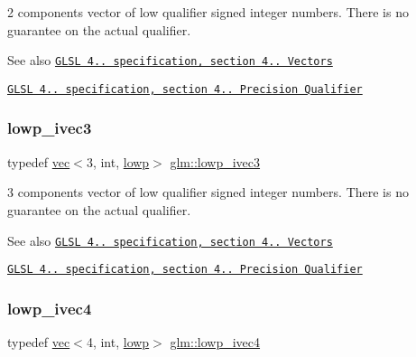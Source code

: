 2 components vector of low qualifier signed integer numbers. There is no guarantee on the actual qualifier.

\begin{DoxySeeAlso}{See also}
\href{http://www.opengl.org/registry/doc/GLSLangSpec.4.20.8.pdf}{\tt G\+L\+SL 4.. specification, section 4.. Vectors} 

\href{http://www.opengl.org/registry/doc/GLSLangSpec.4.20.8.pdf}{\tt G\+L\+SL 4.. specification, section 4.. Precision Qualifier} 
\end{DoxySeeAlso}
\mbox{\label{group__core__precision_ga77f1494e08fca27e26aebbbfb8162298}} 
\subsubsection{\texorpdfstring{lowp\+\_\+ivec3}{lowp\_ivec3}}
{\footnotesize\ttfamily typedef \hyperlink{structglm_1_1vec}{vec}$<$3, int, \hyperlink{namespaceglm_a36ed105b07c7746804d7fdc7cc90ff25ae161af3fc695e696ce3bf69f7332bc2d}{lowp}$>$ \hyperlink{group__core__precision_ga77f1494e08fca27e26aebbbfb8162298}{glm\+::lowp\+\_\+ivec3}}

3 components vector of low qualifier signed integer numbers. There is no guarantee on the actual qualifier.

\begin{DoxySeeAlso}{See also}
\href{http://www.opengl.org/registry/doc/GLSLangSpec.4.20.8.pdf}{\tt G\+L\+SL 4.. specification, section 4.. Vectors} 

\href{http://www.opengl.org/registry/doc/GLSLangSpec.4.20.8.pdf}{\tt G\+L\+SL 4.. specification, section 4.. Precision Qualifier} 
\end{DoxySeeAlso}
\mbox{\label{group__core__precision_ga67d57bf0fc189f8153c7c60ad80ec981}} 
\subsubsection{\texorpdfstring{lowp\+\_\+ivec4}{lowp\_ivec4}}
{\footnotesize\ttfamily typedef \hyperlink{structglm_1_1vec}{vec}$<$4, int, \hyperlink{namespaceglm_a36ed105b07c7746804d7fdc7cc90ff25ae161af3fc695e696ce3bf69f7332bc2d}{lowp}$>$ \hyperlink{group__core__precision_ga67d57bf0fc189f8153c7c60ad80ec981}{glm\+::lowp\+\_\+ivec4}}

